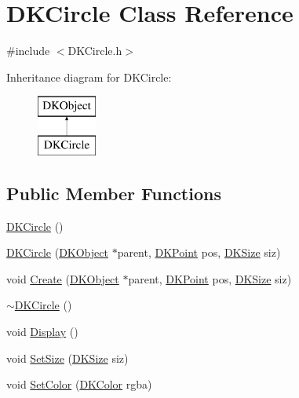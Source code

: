 \hypertarget{class_d_k_circle}{\section{D\-K\-Circle Class Reference}
\label{class_d_k_circle}
}


{\ttfamily \#include $<$D\-K\-Circle.\-h$>$}

Inheritance diagram for D\-K\-Circle\-:\begin{figure}[H]
\begin{center}
\leavevmode
\includegraphics[height=2.000000cm]{class_d_k_circle}
\end{center}
\end{figure}
\subsection*{Public Member Functions}
\begin{DoxyCompactItemize}
\item 
\hyperlink{class_d_k_circle_acbfa039598f58ee91a0ac51e762509ed}{D\-K\-Circle} ()
\item 
\hyperlink{class_d_k_circle_aaca620e18fa1cf615fe2c548c8865cc5}{D\-K\-Circle} (\hyperlink{class_d_k_object}{D\-K\-Object} $\ast$parent, \hyperlink{_d_k_axis_8h_a0ca1f005fbb936f8e7a7f2433591f418}{D\-K\-Point} pos, \hyperlink{_d_k_axis_8h_aaa25a8c7cbf504fffdb8a4208ff7a731}{D\-K\-Size} siz)
\item 
void \hyperlink{class_d_k_circle_a15c06503c7594b4ca36c4f8022b8b56b}{Create} (\hyperlink{class_d_k_object}{D\-K\-Object} $\ast$parent, \hyperlink{_d_k_axis_8h_a0ca1f005fbb936f8e7a7f2433591f418}{D\-K\-Point} pos, \hyperlink{_d_k_axis_8h_aaa25a8c7cbf504fffdb8a4208ff7a731}{D\-K\-Size} siz)
\item 
\hyperlink{class_d_k_circle_a1b9a71c583e763ff673a02b777740175}{$\sim$\-D\-K\-Circle} ()
\item 
void \hyperlink{class_d_k_circle_ae3030694d5c54949827f8b645b632feb}{Display} ()
\item 
void \hyperlink{class_d_k_circle_a72d8802db951cd5e0f3053a9712e8de9}{Set\-Size} (\hyperlink{_d_k_axis_8h_aaa25a8c7cbf504fffdb8a4208ff7a731}{D\-K\-Size} siz)
\item 
void \hyperlink{class_d_k_circle_a54e6f3032773d3d1adeb258930e603a6}{Set\-Color} (\hyperlink{class_d_k_color}{D\-K\-Color} rgba)
\end{DoxyCompactItemize}
